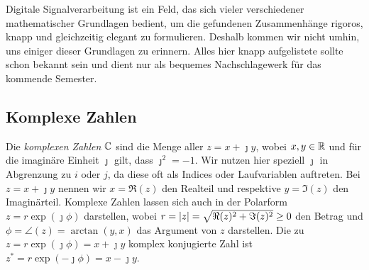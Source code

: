 \begin{itemize}
\end{itemize}

Digitale Signalverarbeitung ist ein Feld, das sich vieler verschiedener mathematischer Grundlagen bedient, um die gefundenen Zusammenh\"ange rigoros, knapp und gleichzeitig elegant zu formulieren.
Deshalb kommen wir nicht umhin, uns einiger dieser Grundlagen zu erinnern. 
Alles hier knapp aufgelistete sollte schon bekannt sein und dient nur als bequemes Nachschlagewerk f\"ur das kommende Semester.
%
\subsection{Komplexe Zahlen}
%
Die \emph{komplexen Zahlen} $\mathbb{C}$ sind die Menge aller $z = x + \jmath y$, wobei $x,y \in \mathbb{R}$ und f\"ur die imagin\"are Einheit $\jmath$ gilt, dass $\jmath^2 = -1$.
Wir nutzen hier speziell $\jmath$ in Abgrenzung zu $i$ oder $j$, da diese oft als Indices oder Laufvariablen auftreten.
Bei $z = x + \jmath y$ nennen wir $x =\Re(z)$ den Realteil und respektive $y = \Im(z)$ den Imagin\"arteil.
Komplexe Zahlen lassen sich auch in der Polarform $z = r \exp(\jmath \phi)$ darstellen, wobei $r = {\left| z \right|} = \sqrt{\Re(z)^2 + \Im(z)^2} \geq 0$ den Betrag und $\phi = \angle(z) = \arctan(y,x)$ das Argument von $z$ darstellen.
Die zu $z = r \exp(\jmath \phi) = x + \jmath y$ komplex konjugierte Zahl ist $z^\ast = r \exp(-\jmath \phi) = x - \jmath y$.

